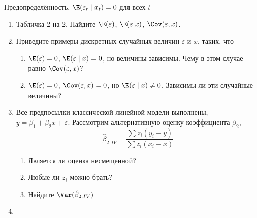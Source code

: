 \documentclass[pdftex,12pt,a4paper]{article}
\def \hb{\hat{\beta}}
\def \e{\varepsilon}
\newcommand{\solution}[1]{}
\begin{document}
Предопределённость, $\E(\e_t\mid x_t)=0$ для всех $t$

\begin{enumerate}
\item Табличка 2 на 2. Найдите $\E(\varepsilon)$, $\E(\varepsilon|x)$, $\Cov(\varepsilon,x)$.
\solution{}

\item Приведите примеры дискретных случайных величин $\e$ и $x$, таких, что
\begin{enumerate}
\item $\E(\e)=0$, $\E(\e\mid x)=0$, но величины зависимы. Чему в этом случае равно $\Cov(\e,x)$?
\item $\E(\e)=0$, $\Cov(\e,x)=0$, но $\E(\e\mid x)\neq 0$. Зависимы ли эти случайные величины? 
\end{enumerate}
\solution{}

\item Все предпосылки классической линейной модели выполнены, $y=\beta_1+\beta_2 x+\varepsilon$. Рассмотрим альтернативную оценку коэффициента $\beta_2$,
\begin{equation}
\hb_{2,IV}=\frac{\sum z_i(y_i-\bar{y})}{\sum z_i(x_i-\bar{x})}
\end{equation}
\begin{enumerate}
\item Является ли оценка несмещенной?
\item Любые ли $z_i$ можно брать?
\item Найдите $\Var(\hb_{2,IV})$
\end{enumerate}
\solution{Да, является. Любые, кроме констант. $\Var(\hb_{2,IV})=\sigma^2 \sum (z_i-\bar{z})^2/ \left(\sum (z_i-\bar{z})x_i \right)^2 $.}

\item 
\end{enumerate}
\end{document}
